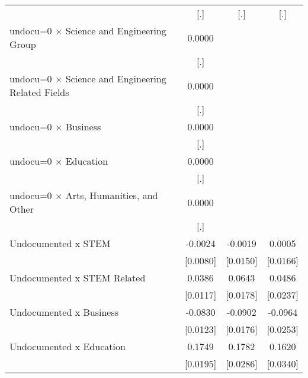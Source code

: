 \begin{table}[htbp]
\begin{tabular}{l*{3}{c}}
                    &         [.]         &         [.]         &         [.]         \\
\addlinespace
undocu=0 $\times$ Science and Engineering Group&      0.0000         &                     &                     \\
                    &         [.]         &                     &                     \\
\addlinespace
undocu=0 $\times$ Science and Engineering Related Fields&      0.0000         &                     &                     \\
                    &         [.]         &                     &                     \\
\addlinespace
undocu=0 $\times$ Business&      0.0000         &                     &                     \\
                    &         [.]         &                     &                     \\
\addlinespace
undocu=0 $\times$ Education&      0.0000         &                     &                     \\
                    &         [.]         &                     &                     \\
\addlinespace
undocu=0 $\times$ Arts, Humanities, and Other&      0.0000         &                     &                     \\
                    &         [.]         &                     &                     \\
\addlinespace
Undocumented x STEM &     -0.0024         &     -0.0019         &      0.0005         \\
                    &    [0.0080]         &    [0.0150]         &    [0.0166]         \\
\addlinespace
Undocumented x STEM Related&      0.0386\sym{***}&      0.0643\sym{***}&      0.0486\sym{**} \\
                    &    [0.0117]         &    [0.0178]         &    [0.0237]         \\
\addlinespace
Undocumented x Business&     -0.0830\sym{***}&     -0.0902\sym{***}&     -0.0964\sym{***}\\
                    &    [0.0123]         &    [0.0176]         &    [0.0253]         \\
\addlinespace
Undocumented x Education&      0.1749\sym{***}&      0.1782\sym{***}&      0.1620\sym{***}\\
                    &    [0.0195]         &    [0.0286]         &    [0.0340]         \\

\end{tabular}
\end{table}

